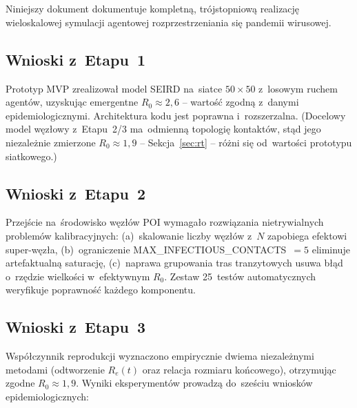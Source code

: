 \documentclass[polish]{projectreport}
\begin{document}
\section{\SectionTitleSummary}
\label{sec:conclusions}

Niniejszy dokument dokumentuje kompletną, trójstopniową realizację
wieloskalowej symulacji agentowej rozprzestrzeniania się pandemii wirusowej.

\subsection*{Wnioski z~Etapu~1}

Prototyp MVP zrealizował model SEIRD na~siatce $50 \times 50$ z~losowym
ruchem agentów, uzyskując emergentne $R_0 \approx 2{,}6$ -- wartość
zgodną z~danymi epidemiologicznymi. Architektura kodu jest poprawna
i~rozszerzalna. (Docelowy model węzłowy z~Etapu~2/3 ma~odmienną topologię
kontaktów, stąd jego niezależnie zmierzone $R_0 \approx 1{,}9$ --
Sekcja~\ref{sec:rt} -- różni się od~wartości prototypu siatkowego.)

\subsection*{Wnioski z~Etapu~2}

Przejście na~środowisko węzłów POI wymagało rozwiązania nietrywialnych
problemów kalibracyjnych: (a)~skalowanie liczby węzłów z~$N$ zapobiega
efektowi super-węzła, (b)~ograniczenie MAX\_INFECTIOUS\_CONTACTS~$=5$
eliminuje artefaktualną saturację, (c)~naprawa grupowania tras tranzytowych
usuwa błąd o~rzędzie wielkości w~efektywnym $R_0$.
Zestaw 25~testów automatycznych weryfikuje poprawność każdego komponentu.

\subsection*{Wnioski z~Etapu~3}

Współczynnik reprodukcji wyznaczono empirycznie dwiema niezależnymi metodami
(odtworzenie $R_e(t)$ oraz relacja rozmiaru końcowego), otrzymując zgodne
$R_0 \approx 1{,}9$. Wyniki eksperymentów prowadzą do~sześciu wniosków
epidemiologicznych:
\end{document}
